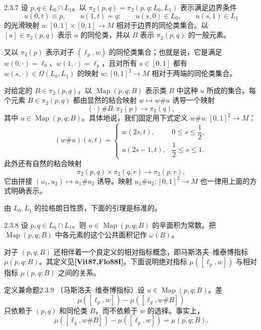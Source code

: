 \begin{definition}{2.3.7}\label{def:2-3-7}
设 $p,q\in L_0\cap L_1$。以
$\pi_2(p,q)=\pi_2(p,q;L_0,L_1)$ 表示满足边界条件
\[
  u(0,t)\equiv p,
  \qquad u(1,t)=q;
  \qquad u(s,0)\in L_0,
  \qquad u(s,1)\in L_1
\]
的光滑映射 $u:[0,1]\times[0,1]\to M$ 相对于边界的同伦类集合。以
$[u]\in\pi_2(p,q)$ 表示 $u$ 的同伦类，并以 $B$ 表示
$\pi_2(p,q)$ 的一般元素。

又以 $\pi_2(p)$ 表示对子 $(\ell_p,w)$ 的同伦类集合；也就是说，它是满足
$w(0,\mathord\cdot)=\ell_0$、$w(1,\mathord\cdot)=\ell_p$，且对所有
$s\in[0,1]$ 都有 $w(s,\mathord\cdot)\in\Omega(L_0,L_1)$ 的映射
$w:[0,1]^2\to M$ 相对于两端的同伦类集合。

对给定的 $B\in\pi_2(p,q)$，以 $\operatorname{Map}(p,q;B)$ 表示类 $B$
中这种 $u$ 所成的集合。每个元素 $B\in\pi_2(p,q)$ 都由显然的粘合映射
$w\mapsto w\#u$ 诱导一个映射
\[
  (\mathord\cdot)\#B:\pi_2(p)\longrightarrow\pi_2(q),
\]
其中 $u\in\operatorname{Map}(p,q;B)$。具体地说，我们固定用下式定义
$w\#u:[0,1]^2\to M$：
\[
  (w\#u)(s,t)=
  \begin{cases}
    w(2s,t),&0\leq s\leq\dfrac12,\\[4pt]
    u(2s-1,t),&\dfrac12\leq s\leq1.
  \end{cases}
\]
此外还有自然的粘合映射
\[
  \pi_2(p,q)\times\pi_2(q,r)\longrightarrow\pi_2(p,r),
\]
它由拼接 $(u_1,u_2)\mapsto u_1\#u_2$ 诱导。映射
$u_1\#u_2:[0,1]^2\to M$ 也一律用上面的方式明确表示。
\end{definition}

由 $L_0,L_1$ 的拉格朗日性质，下面的引理是标准的。

\begin{lemma}{2.3.8}\label{lem:2-3-8}
设 $p,q\in L_0\cap L_1$。则
$u\in\operatorname{Map}(p,q;B)$ 的辛面积为常数。把
$\operatorname{Map}(p,q;B)$ 中各元素的这个公共面积记作 $\omega(B)$。
\end{lemma}

对子 $(p,q;B)$ 还相伴着一个良定义的相对指标概念，即马斯洛夫--维泰博指标
$\mu(p,q;B)$。其定义见\textbf{[Vit87,Flo88I]}。下面说明绝对指标
$\mu([\ell_p,w])$ 与相对指标 $\mu(p,q;B)$ 之间的关系。

\begin{statement}{定义兼命题}{2.3.9}\label{defprop:2-3-9}
（马斯洛夫--维泰博指标）设 $u\in\operatorname{Map}(p,q;B)$。差
\[
  \mu([\ell_p,w])-\mu([\ell_q,w\#B])
\]
只依赖于 $(p,q)$ 和同伦类 $B$，而不依赖于 $w$ 的选择。事实上，
\[
  \mu([\ell_q,w\#B])-\mu([\ell_p,w])=\mu(p,q;B).
\]
\end{statement}

